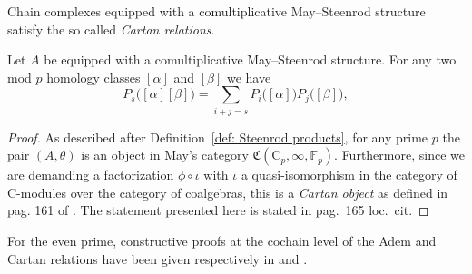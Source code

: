 Chain complexes equipped with a comultiplicative May--Steenrod structure satisfy the so called \textit{Cartan relations}.

\begin{lemma}
	Let $A$ be equipped with a comultiplicative May--Steenrod structure.
	For any two mod $p$ homology classes $[\alpha]$ and $[\beta]$ we have
	\begin{equation*}
	P_s\big([\alpha] [\beta]\big) = \sum_{i+j=s} P_i\big( [\alpha] \big) P_j\big( [\beta] \big),
	\end{equation*}
\end{lemma}

\begin{proof}
	As described after Definition~\ref{def: Steenrod products}, for any prime $p$ the pair $(A, \theta)$ is an object in May's category $\mathfrak{C}(\mathrm C_p, \infty, \mathbb{F}_p)$.
	Furthermore, since we are demanding a factorization $\phi \circ \iota$ with $\iota$ a quasi-isomorphism in the category of $\mathrm{C}$-modules over the category of coalgebras, this is a \textit{Cartan object} as defined in pag. 161 of \cite{may70generalapproach}.
	The statement presented here is stated in pag.~165 loc.~cit.
\end{proof}

For the even prime, constructive proofs at the cochain level of the Adem and Cartan relations have been given respectively in \cite{medina2020adem} and \cite{medina2020cartan}.